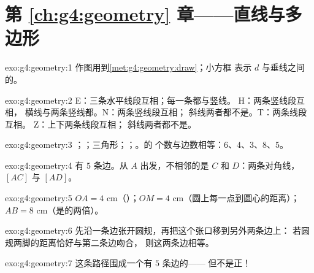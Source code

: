 \section*{第 \ref{ch:g4:geometry} 章——直线与多边形}

\begin{solution}{exo:g4:geometry:1}
作图用到\cref{met:g4:geometry:draw}；小方框
表示 $d$ 与垂线之间的。
\end{solution}

\begin{solution}{exo:g4:geometry:2}
E：三条水平线段互相；每一条都与竖线。
H：两条竖线段互相，
横线与两条竖线都。N：两条竖线段互相；
斜线两者都不是。T：两条线段互相。
Z：上下两条线段互相；
斜线两者都不是。
\end{solution}

\begin{solution}{exo:g4:geometry:3}
；；三角形；；。的
个数与边数相等：$6$、$4$、$3$、$8$、$5$。
\end{solution}

\begin{solution}{exo:g4:geometry:4}
有 $5$ 条边。从 $A$ 出发，不相邻的是 $C$ 和
$D$：两条对角线，$[AC]$ 与 $[AD]$。
\end{solution}

\begin{solution}{exo:g4:geometry:5}
$OA = 4$ cm（）；$OM = 4$ cm（圆上每一点到圆心的距离）；
$AB = 8$ cm（是的两倍）。
\end{solution}

\begin{solution}{exo:g4:geometry:6}
先沿一条边张开圆规，再把这个张口移到另外两条边上：
若圆规两脚的距离恰好与第二条边吻合，
则这两条边相等。
\end{solution}

\begin{solution}{exo:g4:geometry:7}
这条路径围成一个有 $5$ 条边的——
但不是正！
\end{solution}

